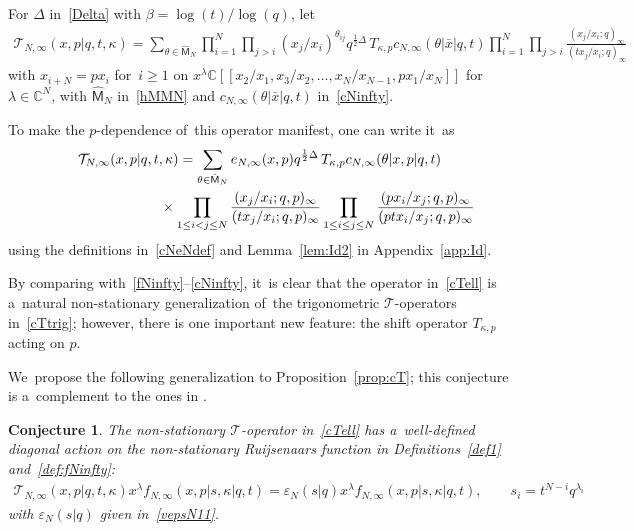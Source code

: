 \documentclass[pdftex]{sigma}%
\numberwithin{equation}{section}
\newtheorem{Conjecture}[Theorem]{Conjecture}
 { \theoremstyle{definition}
\newtheorem{Definition}[Theorem]{Definition}
\newtheorem{Remark}[Theorem]{Remark}
\newtheorem{Fact}[Theorem]{Fact}}
\newcommand{\bx}{\bar{x}}
\newcommand{\C}{{\mathbb C}}
\newcommand{\cT}{{\mathcal T}}
\begin{document}
\begin{Definition}
\label{def:cTell}
For $\Delta$ in~\eqref{Delta} with $\beta = \log(t)/\log(q)$, let
\begin{gather}
\label{cTell}
\cT_{N,\infty}(x,p|q,t,\kappa) = \sum_{\theta\in\hat{\mathsf{M}}_N} \prod_{i=1}^N\prod_{j>i}(x_j/x_i)^{\theta_{ij}} q^{\frac12\Delta} \, T_{\kappa,p}c_{N,\infty}(\theta|\bx|q,t) \prod_{i=1}^N \prod_{j>i} \frac{(x_j/x_i;q)_\infty}{(tx_j/x_i;q)_\infty}
\end{gather}
with $x_{i+N}=p x_i$ for~$i\geq 1$ on $x^\lambda \C[[x_2/x_1,x_3/x_2,\dots,x_{N}/x_{N-1},px_1/x_N]]$ for~$\lambda\in\C^N$, with $\hat{\mathsf{M}}_N$ in~\eqref{hMMN} and $c_{N,\infty}(\theta|\bx|q,t)$ in~\eqref{cNinfty}.
\end{Definition}

\begin{Remark}
\label{rem:Id}
To make the $p$-dependence of~this operator manifest, one can write it~as
\begin{gather*}
\cT_{N,\infty}(x,p|q,t,\kappa) = \sum_{\theta\in\hat{\mathsf{M}}_N} e_{N,\infty}(x,p) q^{\frac12\Delta}\, T_{\kappa,p}c_{N,\infty}(\theta|x,p|q,t)
\\ \hphantom{\cT_{N,\infty}(x,p|q,t,\kappa) =}
{}\times
\prod_{1\leq i<j\leq N}\frac{(x_j/x_i;q,p)_\infty}{(tx_j/x_i;q,p)_\infty}\prod_{1\leq i\leq j\leq N}\frac{(px_i/x_j;q,p)_\infty}{(ptx_i/x_j;q,p)_\infty}
\end{gather*}
using the definitions in~\eqref{cNeNdef} and Lemma~\ref{lem:Id2} in Appendix~\ref{app:Id}.
\end{Remark}

By comparing with~\eqref{fNinfty}--\eqref{cNinfty}, it~is clear that the operator in~\eqref{cTell} is a~natural non-stationary generalization of~the trigonometric $\cT$-operators in~\eqref{cTtrig}; however, there is one important new feature: the shift operator $T_{\kappa,p}$ acting on $p$.

We~propose the following generalization to Proposition~\ref{prop:cT}; this conjecture is a~complement to the ones in \cite{S}.

\begin{Conjecture}
\label{conj:cTell}
The non-stationary $\cT$-operator in~\eqref{cTell} has a~well-defined diagonal action on the non-stationary Ruijsenaars function in Definitions~{\rm \ref{def1}} and~{\rm \ref{def:fNinfty}}:
\begin{gather*}
\cT_{N,\infty}(x,p|q,t,\kappa)x^\lambda f_{N,\infty}(x,p|s,\kappa|q,t) = \varepsilon_N(s|q)x^\lambda f_{N,\infty}(x,p|s,\kappa|q,t),\qquad
s_i = t^{N-i} q^{\lambda_i}
\end{gather*}
with $\varepsilon_N(s|q)$ given in~\eqref{vepsN11}.
\end{Conjecture}
\end{document}
